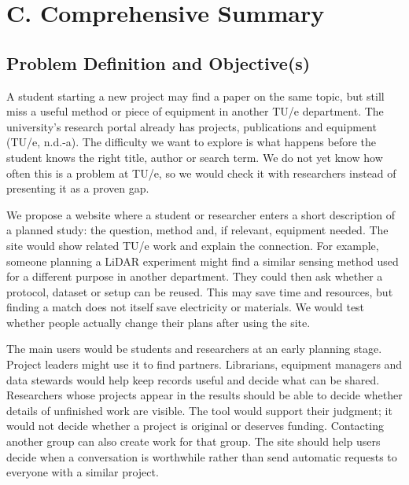 \documentclass[11pt,a4paper]{article}
\begin{document}
\section*{C. Comprehensive Summary}

\subsection*{Problem Definition and Objective(s)}

A student starting a new project may find a paper on the same topic, but still miss a useful method or piece of equipment in another TU/e department. The university's research portal already has projects, publications and equipment (TU/e, n.d.-a). The difficulty we want to explore is what happens before the student knows the right title, author or search term. We do not yet know how often this is a problem at TU/e, so we would check it with researchers instead of presenting it as a proven gap.

We propose a website where a student or researcher enters a short description of a planned study: the question, method and, if relevant, equipment needed. The site would show related TU/e work and explain the connection. For example, someone planning a LiDAR experiment might find a similar sensing method used for a different purpose in another department. They could then ask whether a protocol, dataset or setup can be reused. This may save time and resources, but finding a match does not itself save electricity or materials. We would test whether people actually change their plans after using the site.

The main users would be students and researchers at an early planning stage. Project leaders might use it to find partners. Librarians, equipment managers and data stewards would help keep records useful and decide what can be shared. Researchers whose projects appear in the results should be able to decide whether details of unfinished work are visible. The tool would support their judgment; it would not decide whether a project is original or deserves funding. Contacting another group can also create work for that group. The site should help users decide when a conversation is worthwhile rather than send automatic requests to everyone with a similar project.
\end{document}
